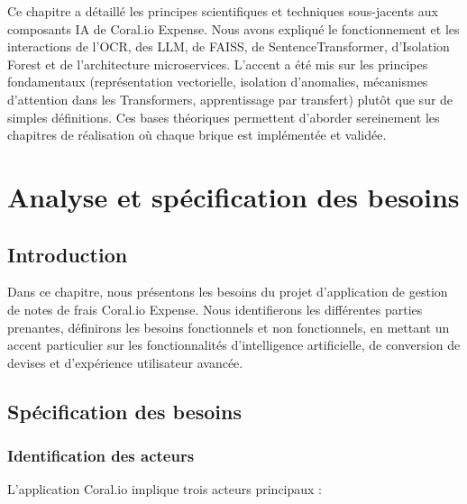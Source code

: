 \documentclass[12pt,a4paper]{report}
\let\oldchapter\chapter
\def\chapter{\clearpage\setcounter{section}{0}\oldchapter}
\begin{document}
Ce chapitre a détaillé les principes scientifiques et techniques sous-jacents aux composants IA de Coral.io Expense. Nous avons expliqué le fonctionnement et les interactions de l’OCR, des LLM, de FAISS, de SentenceTransformer, d’Isolation Forest et de l’architecture microservices. L’accent a été mis sur les principes fondamentaux (représentation vectorielle, isolation d’anomalies, mécanismes d’attention dans les Transformers, apprentissage par transfert) plutôt que sur de simples définitions. Ces bases théoriques permettent d’aborder sereinement les chapitres de réalisation où chaque brique est implémentée et validée.




\chapter{Analyse et spécification des besoins}



\section*{Introduction}


Dans ce chapitre, nous présentons les besoins du projet d'application de gestion de notes de frais Coral.io Expense. Nous identifierons les différentes parties prenantes, définirons les besoins fonctionnels et non fonctionnels, en mettant un accent particulier sur les fonctionnalités d'intelligence artificielle, de conversion de devises et d'expérience utilisateur avancée.



\section{Spécification des besoins}



\subsection{Identification des acteurs}

L'application Coral.io implique trois acteurs principaux :
\end{document}
